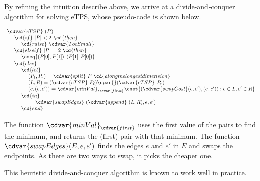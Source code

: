 \begin{cluster}
\label{grp:alg:design::dc::divide-and-conquer-etsp}

\begin{algorithm}
\label{alg:design::dc::divide-and-conquer-etsp}
By refining the intuition describe above, we arrive at a
divide-and-conquer algorithm for solving eTPS, whose pseudo-code is
shown below.

\[
\begin{array}{l}
\cdvar{eTSP}~(P) =
\\
~~~~\cd{if}~|P| < 2~\cd{then}
\\
~~~~~~~~\cd{raise}~\cdvar{TooSmall}
\\
~~~~\cd{else if}~|P| = 2~\cd{then}
\\
~~~~~~~~\cseq{(P[0],P[1]),(P[1],P[0])}
\\
~~~~\cd{else}
\\
~~~~~~~~\cd{let}
\\
~~~~~~~~~~~~(P_\ell, P_r) = \cdvar{split}~P~\cd{along the longest dimension}
\\
~~~~~~~~~~~~(L, R) = (\cdvar{eTSP}~P_\ell) \cpar{} (\cdvar{eTSP}~P_r)
\\
~~~~~~~~~~~~(c,(e,e')) = \cdvar{minVal}_{\cdvar{first}} \cset{(\cdvar{swapCost}(e,e'),(e,e')) : e \in L, e' \in R}
\\
~~~~~~~~\cd{in}
\\
~~~~~~~~~~~~~~~~\cdvar{swapEdges}~(\cdvar{append}~(L,R),e,e')
\\
~~~~~~~~\cd{end}
\end{array}
\]

The function $\cdvar{minVal}_{\cdvar{first}}$ uses the first value of
the pairs to find the minimum, and returns the (first) pair with that minimum. The function
$\cdvar{swapEdges}(E,e,e')$ finds the edges $e$ and $e'$ in $E$ and
swaps the endpoints. As there are two ways to swap, it picks the
cheaper one.

\end{algorithm}
\end{cluster}

\begin{cluster}
\label{grp:rmrk:design::dc::heuristic}

\begin{remark}
\label{rmrk:design::dc::heuristic}
This heuristic divide-and-conquer algorithm is known to work well in
practice.

\end{remark}
\end{cluster}

